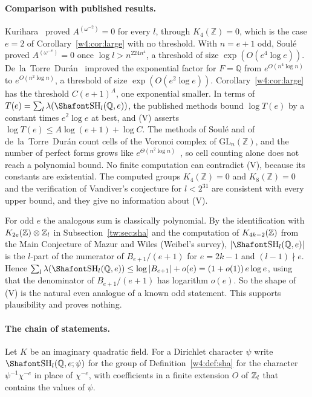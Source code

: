 \paragraph{Comparison with published results.} Kurihara~\cite{kurihara92} proved $A^{(\omega^{-2})}=0$ for every $l$, through $K_4(\mathbb Z)=0$, which is the case $e=2$ of Corollary~\ref{w4:cor:large} with no threshold. With $n=e+1$ odd, Soul\'e~\cite{soule99} proved $A^{(\omega^{-e})}=0$ once $\log l>n^{224n^4}$, a threshold of size $\exp(O(e^4\log e))$. De~la~Torre~Dur\'an~\cite{delatorre} improved the exponential factor for $F=\mathbb Q$ from $e^{O(n^4\log n)}$ to $e^{O(n^2\log n)}$, a threshold of size $\exp(O(e^2\log e))$. Corollary~\ref{w4:cor:large} has the threshold $C(e+1)^A$, one exponential smaller. In terms of $T(e)=\sum_l\lambda(\Sha_l(\mathbb Q,e))$, the published methods bound $\log T(e)$ by a constant times $e^2\log e$ at best, and (V) asserts $\log T(e)\le A\log(e+1)+\log C$. The methods of Soul\'e and of de~la~Torre~Dur\'an count cells of the Voronoi complex of $\mathrm{GL}_n(\mathbb Z)$, and the number of perfect forms grows like $e^{\Theta(n^2\log n)}$~\cite{vanwoerden}, so cell counting alone does not reach a polynomial bound. No finite computation can contradict (V), because its constants are existential. The computed groups $K_4(\mathbb Z)=0$ and $K_8(\mathbb Z)=0$ and the verification of Vandiver's conjecture for $l<2^{31}$ are consistent with every upper bound, and they give no information about (V).

\begin{remark}\label{w4:rem:odd}
For odd $e$ the analogous sum is classically polynomial. By the identification with $K_{2e}(\mathbb Z)\otimes\mathbb Z_l$ in Subsection~\ref{tw:sec:sha} and the computation of $K_{4k-2}(\mathbb Z)$ from the Main Conjecture of Mazur and Wiles (Weibel's survey), $|\Sha_l(\Q,e)|$ is the $l$-part of the numerator of $B_{e+1}/(e+1)$ for $e=2k-1$ and $(l-1)\nmid e$. Hence $\sum_l\lambda(\Sha_l(\Q,e))\le\log|B_{e+1}|+o(e)=(1+o(1))\,e\log e$, using that the denominator of $B_{e+1}/(e+1)$ has logarithm $o(e)$. So the shape of (V) is the natural even analogue of a known odd statement. This supports plausibility and proves nothing.
\end{remark}

\paragraph{The chain of statements.} Let $K$ be an imaginary quadratic field. For a Dirichlet character $\psi$ write $\Sha_l(\mathbb Q,e;\psi)$ for the group of Definition~\ref{w4:def:sha} for the character $\psi^{-1}\chi^{-e}$ in place of $\chi^{-e}$, with coefficients in a finite extension $O$ of $\mathbb Z_l$ that contains the values of $\psi$.


